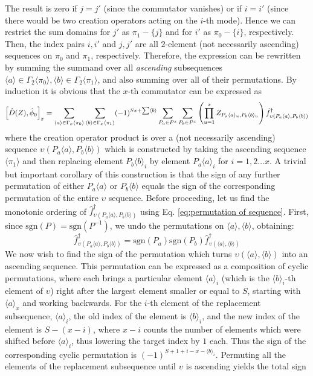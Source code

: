 \documentclass[12pt]{article}
\newcommand{\sgn}{\text{sgn}}
\newcommand{\seq}[1]{\langle #1\rangle}
\newcommand{\hc}{^\dagger}
\begin{document}
	The result is zero if $j=j'$ (since the commutator vanishes) or if $i=i'$ (since there would be two creation operators acting on the $i$-th mode). Hence we can restrict the sum domains for $j'$ as $\pi_1-\{j\}$ and for $i'$ as $\pi_0-\{i\}$, respectively. Then, the index pairs $i,i'$ and $j,j'$ are all $2$-element (not necessarily ascending) sequences on $\pi_0$ and $\pi_1$, respectively. Therefore, the expression can be rewritten by summing the summand over all \textit{ascending} subsequences $\seq{a}\in\Gamma_2\seq{\pi_0}, \seq{b}\in\Gamma_2\seq{\pi_1}$, and also summing over all of their permutations. By induction it is obvious that the $x$-th commutator can be expressed as
	\begin{equation}
	\comm{\hat{D}(Z)}{\hat{\phi}_0}_x=\sum_{\seq{a}\in\Gamma_x\seq{\pi_0}}\sum_{\seq{b}\in\Gamma_x\seq{\pi_1}}(-1)^{Sx+\sum\seq{b}}\sum_{P_a\in P^x}\sum_{P_b\in P^x}\left(\prod_{u=1}^x Z_{P_a\seq{a}_u,P_b\seq{b}_u}\right)\hat{f}\hc_{\upsilon(P_a\seq{a},P_b\seq{b})}
	\end{equation}
	where the creation operator product is over a (not necessarily ascending) sequence $\upsilon(P_a\seq{a},P_b\seq{b})$ which is constructed by taking the ascending sequence $\seq{\pi_1}$ and then replacing element $P_b\seq{b}_i$ by element $P_a\seq{a}_i$ for $i=1,2\dots x$. A trivial but important corollary of this construction is that the sign of any further permutation of either $P_a\seq{a}$ or $P_b\seq{b}$ equals the sign of the corresponding permutation of the entire $\upsilon$ sequence.
	Before proceeding, let us find the monotonic ordering of $\hat{f}\hc_{\upsilon(P_a\seq{a},P_b\seq{b})}$ using Eq. \ref{eq:permutation of sequence}. First, since $\sgn(P)=\sgn(P^{-1})$, we undo the permutations on $\seq{a}, \seq{b}$, obtaining:
	\begin{equation}
	\hat{f}\hc_{\upsilon(P_a\seq{a},P_b\seq{b})}=\sgn(P_a)\sgn(P_b)\hat{f}\hc_{\upsilon(\seq{a},\seq{b})}
	\end{equation}
	We now wish to find the sign of the permutation which turns $\upsilon(\seq{a},\seq{b})$ into an ascending sequence. This permutation can be expressed as a composition of cyclic permutations, where each brings a particular element $\seq{a}_i$ (which is the $\seq{b}_i$-th element of $\upsilon$) right after the largest element smaller or equal to $S$, starting with $\seq{a}_x$ and working backwards. For the $i$-th element of the replacement subsequence, $\seq{a}_i$, the old index of the element is $\seq{b}_i$, and the new index of the element is $S-(x-i)$, where $x-i$ counts the number of elements which were shifted before $\seq{a}_i$, thus lowering the target index by $1$ each. Thus the sign of the corresponding cyclic permutation is $(-1)^{S+1+i-x-\seq{b}_i}$. Permuting all the elements of the replacement subsequence until $\upsilon$ is ascending yields the total sign
\end{document}
